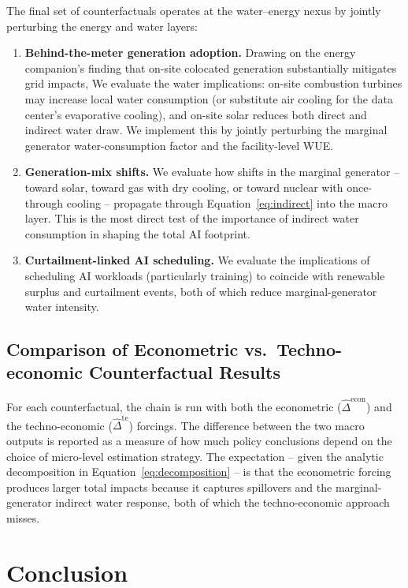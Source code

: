 \documentclass[11pt, letterpaper]{article}
\begin{document}
The final set of counterfactuals operates at the water--energy nexus by jointly perturbing the energy and water layers:
\begin{enumerate}[label=(\roman*)]
\item \textbf{Behind-the-meter generation adoption.} Drawing on the energy companion's finding that on-site colocated generation substantially mitigates grid impacts, We evaluate the water implications: on-site combustion turbines may increase local water consumption (or substitute air cooling for the data center's evaporative cooling), and on-site solar reduces both direct and indirect water draw. We implement this by jointly perturbing the marginal generator water-consumption factor and the facility-level WUE.
\item \textbf{Generation-mix shifts.} We evaluate how shifts in the marginal generator -- toward solar, toward gas with dry cooling, or toward nuclear with once-through cooling -- propagate through Equation~\eqref{eq:indirect} into the macro layer. This is the most direct test of the importance of indirect water consumption in shaping the total AI footprint.
\item \textbf{Curtailment-linked AI scheduling.} We evaluate the implications of scheduling AI workloads (particularly training) to coincide with renewable surplus and curtailment events, both of which reduce marginal-generator water intensity.
\end{enumerate}

\subsection{Comparison of Econometric vs.\ Techno-economic Counterfactual Results}
\label{sec:cf_compare}

For each counterfactual, the chain is run with both the econometric ($\widehat{\Delta}^{\text{econ}}$) and the techno-economic ($\widehat{\Delta}^{\text{te}}$) forcings. The difference between the two macro outputs is reported as a measure of how much policy conclusions depend on the choice of micro-level estimation strategy. The expectation -- given the analytic decomposition in Equation~\eqref{eq:decomposition} -- is that the econometric forcing produces larger total impacts because it captures spillovers and the marginal-generator indirect water response, both of which the techno-economic approach misses.

\section{Conclusion}
\label{sec:conclusion}
\end{document}
